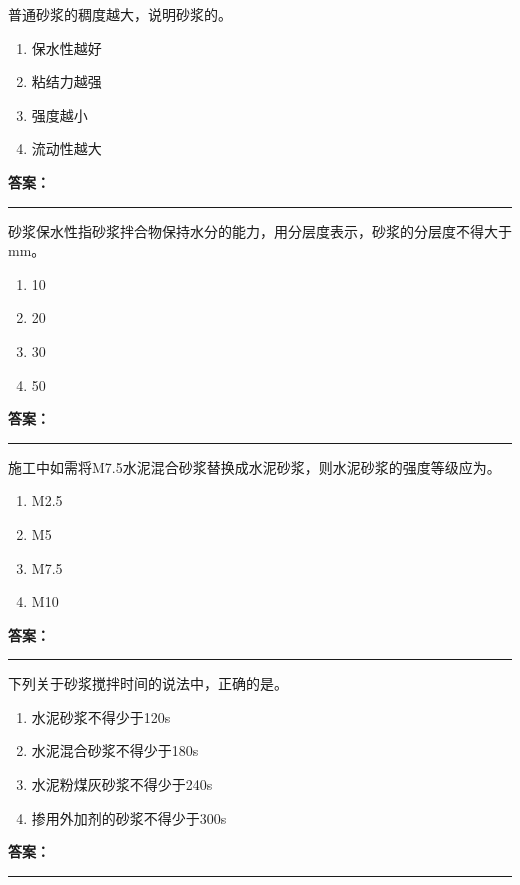 \documentclass[UTF8,fontset=fandol,11pt]{ctexart}
\newcommand{\answerline}{\textcolor{answerred}{\rule{2.4cm}{0.7pt}}}
\begin{document}
\begin{quizbox}[title={第 4 题}]
普通砂浆的稠度越大，说明砂浆的。\\
\begin{enumerate}[label=\Alph*.]
\item 保水性越好
\item 粘结力越强
\item 强度越小
\item 流动性越大
\end{enumerate}
\textbf{\textcolor{answerred}{答案：}} \answerline
\end{quizbox}

\begin{quizbox}[title={第 5 题}]
砂浆保水性指砂浆拌合物保持水分的能力，用分层度表示，砂浆的分层度不得大于 mm。\\
\begin{enumerate}[label=\Alph*.]
\item 10
\item 20
\item 30
\item 50
\end{enumerate}
\textbf{\textcolor{answerred}{答案：}} \answerline
\end{quizbox}

\begin{quizbox}[title={第 6 题}]
施工中如需将M7.5水泥混合砂浆替换成水泥砂浆，则水泥砂浆的强度等级应为。\\
\begin{enumerate}[label=\Alph*.]
\item M2.5
\item M5
\item M7.5
\item M10
\end{enumerate}
\textbf{\textcolor{answerred}{答案：}} \answerline
\end{quizbox}

\begin{quizbox}[title={第 7 题}]
下列关于砂浆搅拌时间的说法中，正确的是。\\
\begin{enumerate}[label=\Alph*.]
\item 水泥砂浆不得少于120s
\item 水泥混合砂浆不得少于180s
\item 水泥粉煤灰砂浆不得少于240s
\item 掺用外加剂的砂浆不得少于300s
\end{enumerate}
\textbf{\textcolor{answerred}{答案：}} \answerline
\end{quizbox}
\end{document}
